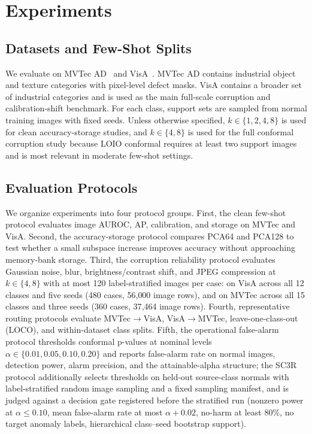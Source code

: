 \section{Experiments}
\subsection{Datasets and Few-Shot Splits}
We evaluate on MVTec AD~\cite{mvtec2019} and VisA~\cite{visa2022}. MVTec AD contains industrial object and texture categories with pixel-level defect masks. VisA contains a broader set of industrial categories and is used as the main full-scale corruption and calibration-shift benchmark. For each class, support sets are sampled from normal training images with fixed seeds. Unless otherwise specified, $k\in\{1,2,4,8\}$ is used for clean accuracy-storage studies, and $k\in\{4,8\}$ is used for the full conformal corruption study because LOIO conformal requires at least two support images and is most relevant in moderate few-shot settings.

\subsection{Evaluation Protocols}
We organize experiments into four protocol groups. First, the clean few-shot protocol evaluates image AUROC, AP, calibration, and storage on MVTec and VisA. Second, the accuracy-storage protocol compares PCA64 and PCA128 to test whether a small subspace increase improves accuracy without approaching memory-bank storage. Third, the corruption reliability protocol evaluates Gaussian noise, blur, brightness/contrast shift, and JPEG compression at $k\in\{4,8\}$ with at most 120 label-stratified images per case: on VisA across all 12 classes and five seeds (480 cases, 56{,}000 image rows), and on MVTec across all 15 classes and three seeds (360 cases, 37{,}464 image rows). Fourth, representative routing protocols evaluate MVTec$\rightarrow$VisA, VisA$\rightarrow$MVTec, leave-one-class-out (LOCO), and within-dataset class splits. Fifth, the operational false-alarm protocol thresholds conformal p-values at nominal levels $\alpha\in\{0.01,0.05,0.10,0.20\}$ and reports false-alarm rate on normal images, detection power, alarm precision, and the attainable-alpha structure; the SC3R protocol additionally selects thresholds on held-out source-class normals with label-stratified random image sampling and a fixed sampling manifest, and is judged against a decision gate registered before the stratified run (nonzero power at $\alpha\le0.10$, mean false-alarm rate at most $\alpha{+}0.02$, no-harm at least 80\%, no target anomaly labels, hierarchical class--seed bootstrap support).

